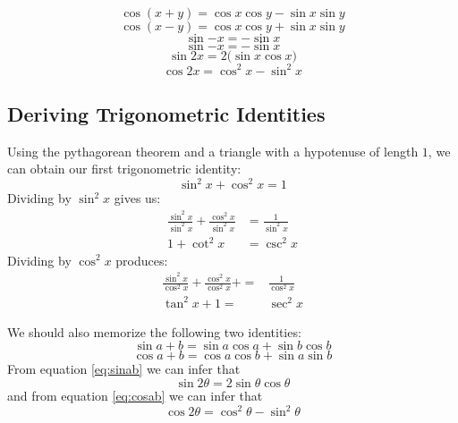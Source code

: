 \begin{equation}
  \cos(x+y)=\cos x \cos y - \sin x \sin y
  \label{eq:cosxpy}
\end{equation}
\begin{equation}
  \cos(x-y)=\cos x \cos y + \sin x \sin y
\end{equation}
\begin{equation}
  \sin{-x}=-\sin x
\end{equation}
\begin{equation}
  \sin{-x}=-\sin x
\end{equation}
\begin{equation}
  \sin{2x}=2 \big( \sin x \cos x \big)
\end{equation}
\begin{equation}
  \cos{2x}=\cos^2x-\sin^2x
\end{equation}

\subsection{Deriving Trigonometric Identities}\label{sec:trigderiv}

Using the pythagorean theorem and a triangle with a hypotenuse of length $1$, we can obtain our first trigonometric identity:
\begin{equation}
	\sin^2x+\cos^2x=1
  \label{eq:pyth}
\end{equation}
Dividing by $\sin^2x$ gives us:
\begin{align}
\frac{\sin^2x}{\sin^2x}+\frac{\cos^2x}{\sin^2x}&=\frac{1}{\sin^2x} \nonumber \\
	1+\cot^2x&=\csc^2x
\end{align}
Dividing by $\cos^2x$ produces:
\begin{align}
  \frac{\sin^2x}{\cos^2x}+\frac{\cos^2x}{\cos^2x}+=&\frac{1}{\cos^2x} \nonumber \\
	\tan^2x+1=&\sec^2x
\end{align}

We should also memorize the following two identities:
\begin{equation}
  \sin{a+b}=\sin a \cos a + \sin b \cos b
  \label{eq:sinab}
\end{equation}
\begin{equation}
  \cos{a+b}=\cos a \cos b + \sin a \sin b
  \label{eq:cosab}
\end{equation}
From equation \eqref{eq:sinab} we can infer that
\begin{equation}
  \sin{2\theta}=2 \sin \theta \cos \theta
  \label{eq:sin2q}
\end{equation}
and from equation \eqref{eq:cosab} we can infer that
\begin{equation}
  \cos{2\theta}=\cos^2 \theta - \sin^2\theta
  \label{eq:cos2q}
\end{equation}

